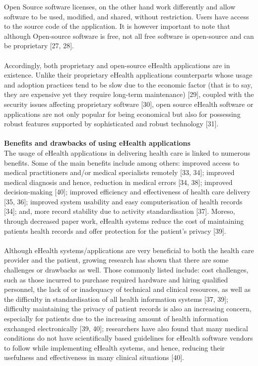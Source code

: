 \documentclass[a4paper]{article}
\begin{document}
Open Source software licenses,  on the other hand work differently and allow software to be used, modified, and shared, without restriction. Users have access to the source code of the application. It is however important to note that although Open-source software is free, not all free software is open-source and can be proprietary [27, 28].\\ \\
Accordingly, both proprietary and open-source eHealth applications are in existence. Unlike  their proprietary eHealth applications counterparts whose usage and adoption practices tend to be slow due to the economic factor (that is to say, they are expensive yet they require long-term maintenance) [29], coupled with the security issues affecting proprietary software [30], open source eHealth software or applications are not only popular for being economical but also for possessing robust features supported by sophisticated and robust technology [31]. \\ \\
{\bf Benefits and drawbacks of using eHealth applications}\\
The usage of eHealth applications in delivering health care is linked to numerous benefits. Some of the main benefits include among others: 
improved access to medical practitioners and/or medical specialists remotely [33, 34]; improved medical diagnosis and hence, reduction in medical errors [34, 38]; improved decision-making [40]; improved efficiency and effectiveness of health care delivery [35, 36]; improved system usability and easy computerisation of health records [34]; and, more record stability due to activity standardisation [37]. Moreso, through decreased paper work, eHealth systems reduce the cost of maintaining patients health records and offer protection for the patient's privacy [39].\\ \\
Although eHealth systems/applications are very beneficial to both the health care provider and the patient, growing research has shown that there are some challenges or drawbacks as well. Those commonly listed include: cost challenges, such as those incurred to purchase required hardware and hiring qualified personnel, the lack of or inadequacy of technical and clinical resources, as well as the difficulty in standardisation of all health information systems [37, 39]; difficulty maintaining the privacy of patient records is also an increasing concern, especially for patients due to the increasing amount of health information exchanged electronically [39, 40]; researchers have also found that many medical conditions do not have scientifically based guidelines for eHealth software vendors to follow while implementing eHealth systems, and hence, reducing their usefulness and effectiveness in many clinical situations [40].\\ 
\end{document}
